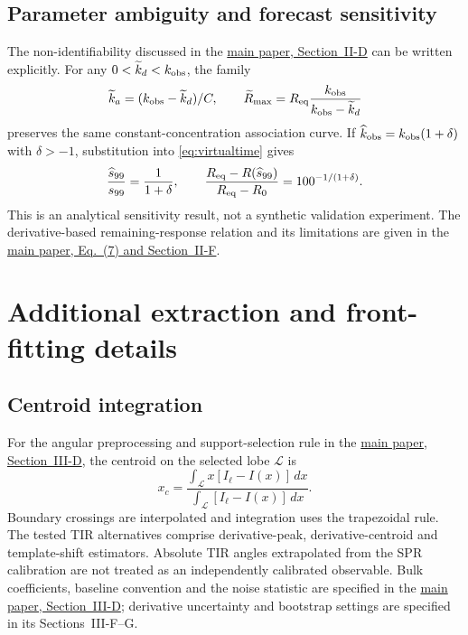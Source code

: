 \documentclass[lettersize,journal]{IEEEtran}
\newcommand{\mainpaper}[1]{\href{SPR_smart_stop_current.pdf}{main paper, #1}}
\begin{document}
\subsection{Parameter ambiguity and forecast sensitivity}
The non-identifiability discussed in the \mainpaper{Section~II-D} can be
written explicitly. For any $0<\widetilde k_d<k_{\rm obs}$, the family
\begin{equation}
 \widetilde k_a=(k_{\rm obs}-\widetilde k_d)/C,\qquad
 \widetilde R_{\max}=R_{\rm eq}\frac{k_{\rm obs}}{k_{\rm obs}-\widetilde k_d}
\end{equation}
preserves the same constant-concentration association curve.
If $\widehat k_{\rm obs}=k_{\rm obs}(1+\delta)$ with $\delta>-1$,
substitution into \eqref{eq:virtualtime} gives
\begin{equation}
 \frac{\widehat s_{99}}{s_{99}}=\frac{1}{1+\delta},\qquad
 \frac{R_{\rm eq}-R(\widehat s_{99})}{R_{\rm eq}-R_0}
 =100^{-1/(1+\delta)}.
\end{equation}
This is an analytical sensitivity result, not a synthetic validation
experiment. The derivative-based remaining-response relation and its
limitations are given in the \mainpaper{Eq.~(7) and Section~II-F}.

\section{Additional extraction and front-fitting details}
\subsection{Centroid integration}
For the angular preprocessing and support-selection rule in the
\mainpaper{Section~III-D}, the centroid on the selected lobe $\mathcal L$ is
\begin{equation}
 x_c=\frac{\int_{\mathcal L}x[I_\ell-I(x)]\,dx}
 {\int_{\mathcal L}[I_\ell-I(x)]\,dx}.
\end{equation}
Boundary crossings are interpolated and integration uses the trapezoidal
rule. The tested TIR alternatives comprise derivative-peak,
derivative-centroid and template-shift estimators. Absolute TIR angles
extrapolated from the SPR calibration are not treated as an independently
calibrated observable. Bulk coefficients, baseline convention and the
noise statistic are specified in the \mainpaper{Section~III-D}; derivative
uncertainty and bootstrap settings are specified in its Sections~III-F--G.
\end{document}
